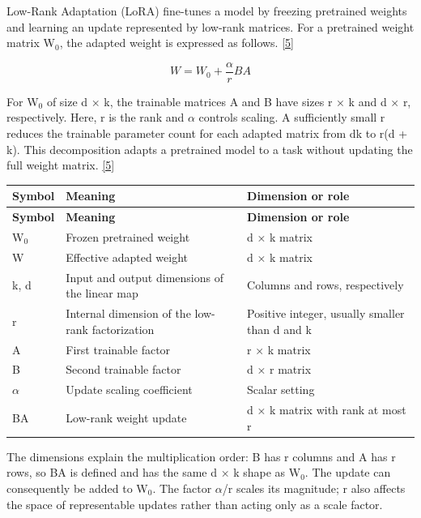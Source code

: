\documentclass[11pt,a4paper]{article}
\begin{document}
Low-Rank Adaptation (LoRA) fine-tunes a model by freezing pretrained weights and learning an update represented by low-rank matrices. For a pretrained weight matrix W\ensuremath{{}_0}, the adapted weight is expressed as follows. \href{\detokenize{https://arxiv.org/abs/2106.09685}}{[5]}\par

\[W = W_0 + \frac{\alpha}{r}BA\]

For W\ensuremath{{}_0} of size d × k, the trainable matrices A and B have sizes r × k and d × r, respectively. Here, r is the rank and \ensuremath{\alpha} controls scaling. A sufficiently small r reduces the trainable parameter count for each adapted matrix from dk to r(d + k). This decomposition adapts a pretrained model to a task without updating the full weight matrix. \href{\detokenize{https://arxiv.org/abs/2106.09685}}{[5]}\par

\begingroup\small
\begin{longtable}{@{}>{\raggedright\arraybackslash}p{}>{\raggedright\arraybackslash}p{}>{\raggedright\arraybackslash}p{}@{}}
\toprule
\textbf{Symbol} & \textbf{Meaning} & \textbf{Dimension or role} \\
\midrule\endfirsthead
\toprule
\textbf{Symbol} & \textbf{Meaning} & \textbf{Dimension or role} \\
\midrule\endhead
\bottomrule\endfoot
W\ensuremath{{}_0} & Frozen pretrained weight & d × k matrix \\
W & Effective adapted weight & d × k matrix \\
k, d & Input and output dimensions of the linear map & Columns and rows, respectively \\
r & Internal dimension of the low-rank factorization & Positive integer, usually smaller than d and k \\
A & First trainable factor & r × k matrix \\
B & Second trainable factor & d × r matrix \\
\ensuremath{\alpha} & Update scaling coefficient & Scalar setting \\
BA & Low-rank weight update & d × k matrix with rank at most r \\
\end{longtable}
\endgroup

The dimensions explain the multiplication order: B has r columns and A has r rows, so BA is defined and has the same d × k shape as W\ensuremath{{}_0}. The update can consequently be added to W\ensuremath{{}_0}. The factor \ensuremath{\alpha}/r scales its magnitude; r also affects the space of representable updates rather than acting only as a scale factor.\par
\end{document}
